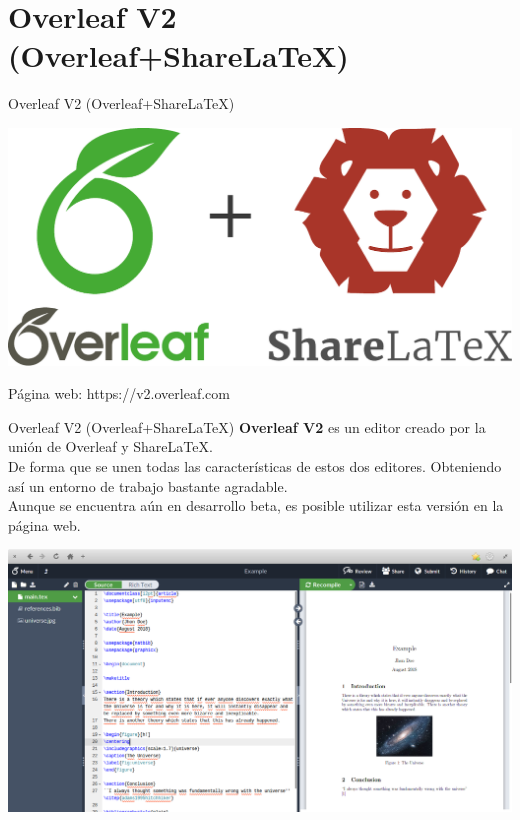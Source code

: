 \documentclass[12pt,aspectratio=43]{beamer}
\begin{document}
\section{Overleaf V2 (Overleaf+ShareLaTeX)}
\begin{frame}{Overleaf V2 (Overleaf+ShareLaTeX)}{}
\begin{center}
	\includegraphics[width=0.7\linewidth]{Overleaf+ShareLaTeX_Logo}
\end{center}

Página web: https://v2.overleaf.com
\end{frame}

\begin{frame}{Overleaf V2 (Overleaf+ShareLaTeX)}{}
\alert{\bf Overleaf V2} es un editor creado por la unión de Overleaf y ShareLaTeX.\pause\\[1em]

De forma que se unen todas las características de estos dos editores. Obteniendo así un entorno de trabajo bastante agradable.\pause\\[1em]

Aunque se encuentra aún en desarrollo beta, es posible utilizar esta versión en la página web.
\end{frame}

\begin{frame}[plain]{}{}
\includegraphics[width=\linewidth]{OverleafV2_Screen}
\end{frame}
\end{document}
